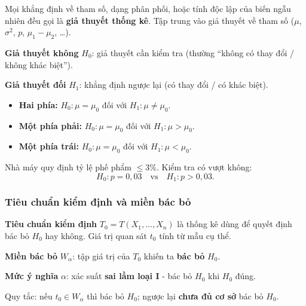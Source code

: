 \documentclass[12pt,a4paper]{article}
\begin{document}
\begin{dinhnghia}[title={Giả thuyết thống kê}]
  Mọi khẳng định về tham số, dạng phân phối, hoặc tính độc lập của biến ngẫu nhiên đều gọi là \textbf{giả thuyết thống kê}. Tập trung vào giả thuyết về tham số ($\mu$, $\sigma^2$, $p$, $\mu_1-\mu_2$, \ldots).
\end{dinhnghia}

\begin{dinhnghia}[title={Giả thuyết không và đối thuyết}]
  \textbf{Giả thuyết không} $H_0$: giả thuyết cần kiểm tra (thường ``không có thay đổi / không khác biệt'').
  
  \textbf{Giả thuyết đối} $H_1$: khẳng định ngược lại (có thay đổi / có khác biệt).
\end{dinhnghia}

\begin{vidu}[title={Cặp giả thuyết về $\mu$}]
\begin{itemize}
  \item \textbf{Hai phía:} $H_0: \mu = \mu_0$ đối với $H_1: \mu \ne \mu_0$.
  \item \textbf{Một phía phải:} $H_0: \mu = \mu_0$ đối với $H_1: \mu > \mu_0$.
  \item \textbf{Một phía trái:} $H_0: \mu = \mu_0$ đối với $H_1: \mu < \mu_0$.
\end{itemize}
\end{vidu}

\begin{vidu}[title={Giả thuyết về tỷ lệ phế phẩm}]
Nhà máy quy định tỷ lệ phế phẩm $\le 3\%$. Kiểm tra có vượt không:
\[
  H_0: p = 0{,}03 \quad\text{vs}\quad H_1: p > 0{,}03.
\]
\end{vidu}

\subsubsection{Tiêu chuẩn kiểm định và miền bác bỏ}

\begin{dinhnghia}[title={Tiêu chuẩn kiểm định}]
  \textbf{Tiêu chuẩn kiểm định} $T_0 = T(X_1,\ldots,X_n)$ là thống kê dùng để quyết định bác bỏ $H_0$ hay không. Giá trị quan sát $t_0$ tính từ mẫu cụ thể.
\end{dinhnghia}

\begin{dinhnghia}[title={Miền bác bỏ và mức ý nghĩa}]
  \textbf{Miền bác bỏ} $W_\alpha$: tập giá trị của $T_0$ khiến ta \textbf{bác bỏ} $H_0$.
  
  \textbf{Mức ý nghĩa} $\alpha$: xác suất \textbf{sai lầm loại I} - bác bỏ $H_0$ khi $H_0$ đúng.
  
  Quy tắc: nếu $t_0 \in W_\alpha$ thì bác bỏ $H_0$; ngược lại \textbf{chưa đủ cơ sở} bác bỏ $H_0$.
\end{dinhnghia}
\end{document}
